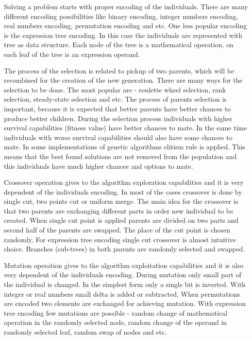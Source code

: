 \documentclass[graybox]{svmult}
\begin{document}
Solving a problem starts with proper encoding of the individuals. There are many different encoding possibilities like binary encoding, integer numbers encoding, real numbers encoding, permutation encoding and etc. One less popular encoding is the expression tree encoding. In this case the individuals are represented with tree as data structure. Each node of the tree is a mathematical operation, on each leaf of the tree is an expression operand. 

The process of the selection is related to pickup of two parents, which will be recombined for the creation of the new generation. There are many ways for the selection to be done. The most popular are - roulette wheel selection, rank selection, steady-state selection and etc. The process of parents selection is important, because it is expected that better parents have better chances to produce better children. During the selection process individuals with higher survival capabilities (fitness value) have better chances to mate. In the same time individuals with worse survival capabilities should also have some chances to mate. In some implementations of genetic algorithms elitism rule is applied. This means that the best found solutions are not removed from the population and this individuals have much higher chances and options to mate. 

Crossover operation gives to the algorithm exploration capabilities and it is very dependent of the individuals encoding. In most of the cases crossover is done by single cut, two points cut or uniform merge. The main idea for the crossover is that two parents are exchanging different parts in order new individual to be created. When single cut point is applied parents are divided on two parts and second half of the parents are swapped. The place of the cut point is chosen randomly. For expression tree encoding single cut crossover is almost intuitive choice. Branches (sub-trees) in both parents are randomly selected and swapped. 

Mutation operation gives to the algorithm exploitation capabilities and it is also very dependent of the individuals encoding. During mutation only small part of the individual is changed. In the simplest form only a single bit is inverted. With integer or real numbers small delta is added or subtracted. When permutations are encoded two elements are exchanged for achieving mutation. With expression tree encoding few mutations are possible - random change of mathematical operation in the randomly selected node, random change of the operand in randomly selected leaf, random swap of nodes and etc. 
\end{document}
